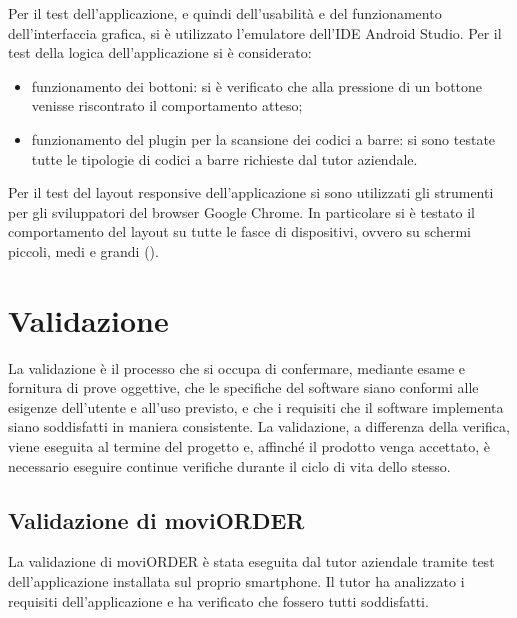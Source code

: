 Per il test dell'applicazione, e quindi dell'usabilità e del funzionamento dell'interfaccia grafica, si è utilizzato l'emulatore dell'IDE Android Studio. Per il test della logica dell'applicazione si è considerato:
\begin{itemize}
	\item funzionamento dei bottoni: si è verificato che alla pressione di un bottone venisse riscontrato il comportamento atteso;
	\item funzionamento del plugin per la scansione dei codici a barre: si sono testate tutte le tipologie di codici a barre richieste dal tutor aziendale.
\end{itemize}

Per il test del layout responsive dell'applicazione si sono utilizzati gli strumenti per gli sviluppatori del browser Google Chrome. In particolare si è testato il comportamento del layout su tutte le fasce di dispositivi, ovvero su schermi piccoli, medi e grandi ().

\section{Validazione}

La validazione è il processo che si occupa di confermare, mediante esame e fornitura di prove oggettive, che le specifiche del software siano conformi alle esigenze dell'utente e all'uso previsto, e che i requisiti che il software implementa siano soddisfatti in maniera consistente.
La validazione, a differenza della verifica, viene eseguita al termine del progetto e, affinché il prodotto venga accettato, è necessario eseguire continue verifiche durante il ciclo di vita dello stesso.

\subsection{Validazione di moviORDER}

La validazione di moviORDER è stata eseguita dal tutor aziendale tramite test dell'applicazione installata sul proprio smartphone. Il tutor ha analizzato i requisiti dell'applicazione e ha verificato che fossero tutti soddisfatti.